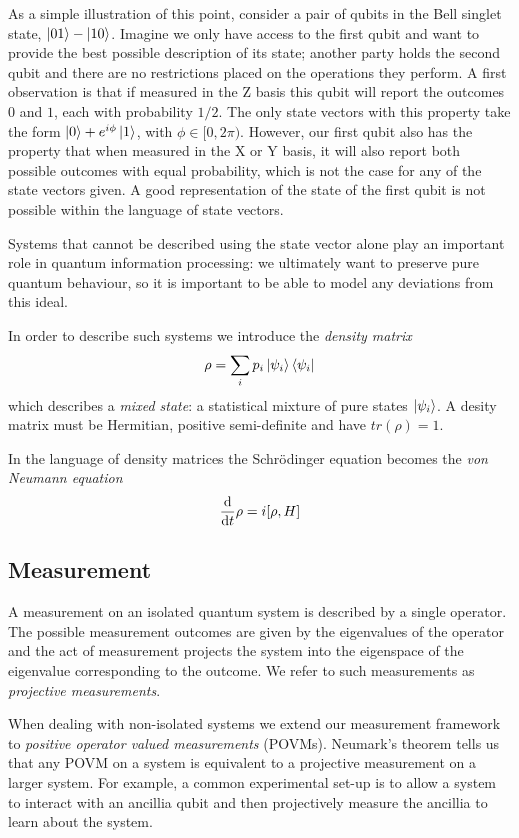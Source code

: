 As a simple illustration of this point, consider a pair of qubits in the Bell singlet state, $\left\vert01\right\rangle - \left\vert10\right\rangle$. Imagine we only have access to the first qubit and want to provide the best possible description of its state; another party holds the second qubit and there are no restrictions placed on the operations they perform. A first observation is that if measured in the Z basis this qubit will report the outcomes $0$ and $1$, each with probability $1/2$. The only state vectors with this property take the form $\left\vert0\right\rangle + e^{i\phi}\left\vert1\right\rangle$, with $\phi \in [0, 2\pi)$. However, our first qubit also has the property that when measured in the X or Y basis, it will also report both possible outcomes with equal probability, which is not the case for any of the state vectors given. A good representation of the state of the first qubit is not possible within the language of state vectors.

Systems that cannot be described using the state vector alone play an important role in quantum information processing: we ultimately want to preserve pure quantum behaviour, so it is important to be able to model any deviations from this ideal.

In order to describe such systems we introduce the \textit{density matrix}
\begin{align}
  \rho = \sum_i p_i \left\vert\psi_i\right\rangle\left\langle \psi_i\right\vert 
\end{align}
which describes a \textit{mixed state}: a statistical mixture of pure states $\left\vert\psi_i\right\rangle$. A desity matrix must be Hermitian, positive semi-definite and have $tr(\rho) = 1$.

In the language of density matrices the Schr\"odinger equation becomes the \textit{von Neumann equation}
\begin{align}
  \frac{\mathrm{d}}{\mathrm{d}t} \rho = i [\rho, H]
\end{align}


\subsection{Measurement}

A measurement on an isolated quantum system is described by a single operator. The possible measurement outcomes are given by the eigenvalues of the operator and the act of measurement projects the system into the eigenspace of the eigenvalue corresponding to the outcome. We refer to such measurements as \textit{projective measurements}.

When dealing with non-isolated systems we extend our measurement framework to \textit{positive operator valued measurements} (POVMs). Neumark's theorem \cite{?} tells us that any POVM on a system is equivalent to a projective measurement on a larger system. For example, a common experimental set-up is to allow a system to interact with an ancillia qubit and then projectively measure the ancillia to learn about the system.

